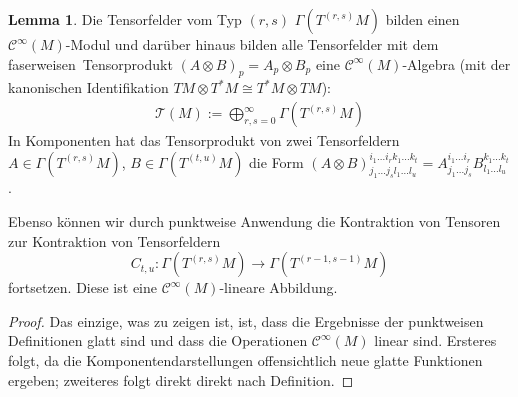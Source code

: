\documentclass[a4paper]{scrreprt}
\numberwithin{equation}{chapter}
\newcommand{\sC}{\mathcal{C}^{\infty}}
\theoremstyle{definition}
\newtheorem{lemma}[defn]{Lemma}
\begin{document}
		\begin{lemma}
			Die Tensorfelder vom Typ $(r,s)$ $\Gamma(T^{(r,s)}M)$ bilden einen $\sC(M)$-Modul und darüber hinaus bilden alle Tensorfelder mit dem \glqq faserweisen\grqq\ Tensorprodukt $(A\otimes B)_p=A_p\otimes B_p$ eine $\sC(M)$-Algebra (mit der kanonischen Identifikation $TM\otimes T^*M\cong T^*M\otimes TM$):
			\begin{align*}
				\mathcal{T}(M):=\bigoplus_{r,s=0}^{\infty}\Gamma(T^{(r,s)}M)
			\end{align*}
			In Komponenten hat das Tensorprodukt von zwei Tensorfeldern $A \in \Gamma(T^{(r,s)}M)$, $B \in \Gamma(T^{(t,u)}M)$ die Form $(A\otimes B)^{i_1 \dots i_r k_1 \dots k_t}_{j_1 \dots j_s l_1 \dots l_u} = A^{i_1 \dots i_r}_{j_1 \dots j_s} B^{k_1 \dots k_t}_{l_1 \dots l_u}$.
			
			Ebenso können wir durch punktweise Anwendung die Kontraktion von Tensoren zur Kontraktion von Tensorfeldern
			\[C_{t,u}\colon \Gamma(T^{(r,s)}M) \to \Gamma(T^{(r-1,s-1)}M)\]
			fortsetzen. Diese ist eine $\sC(M)$-lineare Abbildung.
			
			\begin{proof}
				Das einzige, was zu zeigen ist, ist, dass die Ergebnisse der punktweisen Definitionen glatt sind und dass die Operationen $\sC(M)$ linear sind. Ersteres folgt, da die Komponentendarstellungen offensichtlich neue glatte Funktionen ergeben; zweiteres folgt direkt direkt nach Definition.
			\end{proof}
		\end{lemma}
\end{document}
